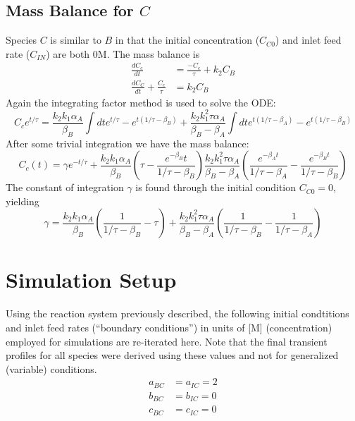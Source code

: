 \documentclass[a4paper,12pt]{article}
\begin{document}
\newpage 
\subsection{Mass Balance for $C$}

Species $C$ is similar to $B$ in that the initial concentration ($C_{C0}$) and inlet feed rate ($C_{IN}$) are both 0M. 
The mass balance is 
\begin{align}
    \frac{dC_c}{dt} &= \frac{-C_c}{\tau} + k_2 C_B\\
    \frac{dC_C}{dt} + \frac{C_c}{\tau} &= k_2 C_B
\end{align}
Again the integrating factor method is used to solve the ODE:
\begin{equation}
    C_c e^{t/\tau} = \frac{k_2 k_1 \alpha_A}{\beta_B} \int dt e^{t/\tau} - e^{t(1/\tau - \beta_B)} + 
        \frac{k_2 k_1^2 \tau \alpha_A}{\beta_B - \beta_A} \int dt e^{t (1/\tau - \beta_A)} - e^{t(1/\tau - \beta_B)} 
\end{equation}
After some trivial integration we have the mass balance:
\begin{equation}
    C_c(t) = \gamma e^{-t/\tau} + \frac{k_2 k_1 \alpha_A}{\beta_B}
    \left(\tau - \frac{e^{-\beta_B}t}{1/\tau - \beta_B}\right) \frac{k_2 k_1^2 \tau \alpha_A}{\beta_B - \beta_A} 
                \left(\frac{e^{-\beta_A t}}{1/\tau - \beta_A} - \frac{e^{-\beta_B t}}{1/\tau - \beta_B}\right)
\end{equation}
The constant of integration $\gamma$ is found through the initial condition $C_{C0} = 0$, yielding 
\begin{equation}
    \gamma = \frac{k_2 k_1 \alpha_A}{\beta_B}\left(\frac{1}{1/\tau - \beta_B} - \tau\right) + 
        \frac{k_2 k_1^2 \tau \alpha_A}{\beta_B - \beta_A}\left(\frac{1}{1/\tau - \beta_B} - \frac{1}{1/\tau - \beta_A}\right)
\end{equation}


\section{Simulation Setup}

Using the reaction system previously described, the following initial condtitions and inlet feed rates (``boundary conditions'') in units of [M] (concentration) employed for simulations are re-iterated here. 
Note that the final transient profiles for all species were derived using these values and not for generalized (variable) conditions.
\begin{align}
	a_{BC} &= a_{IC} = 2\\
	b_{BC} &= b_{IC} = 0\\
	c_{BC} &= c_{IC} = 0
\end{align}
\end{document}
